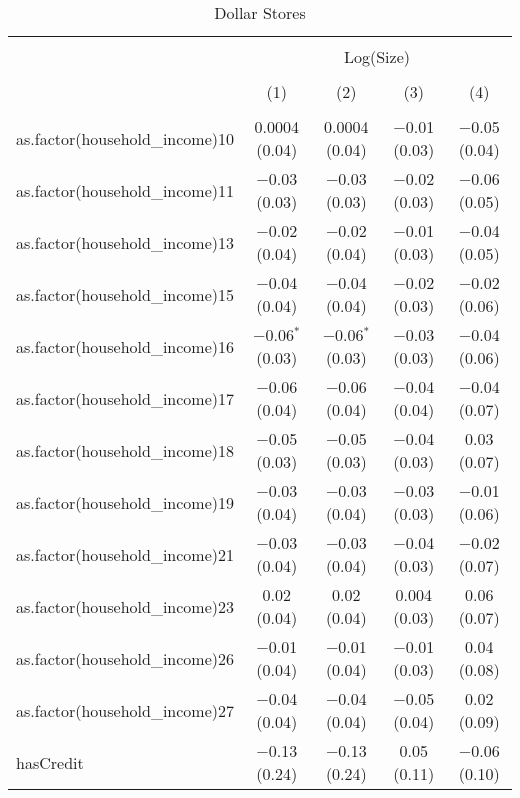 
\begin{table}[!htbp] \centering 
  \caption{Dollar Stores} 
  \label{tab:packageSizeDollarTamponLiqAppendix} 
\begin{tabular}{@{\extracolsep{5pt}}lcccc} 
\\[-1.8ex]\hline 
\hline \\[-1.8ex] 
 & \multicolumn{4}{c}{Log(Size)} \\ 
\\[-1.8ex] & (1) & (2) & (3) & (4)\\ 
\hline \\[-1.8ex] 
 as.factor(household\_income)10 & 0.0004 (0.04) & 0.0004 (0.04) & $-$0.01 (0.03) & $-$0.05 (0.04) \\ 
  as.factor(household\_income)11 & $-$0.03 (0.03) & $-$0.03 (0.03) & $-$0.02 (0.03) & $-$0.06 (0.05) \\ 
  as.factor(household\_income)13 & $-$0.02 (0.04) & $-$0.02 (0.04) & $-$0.01 (0.03) & $-$0.04 (0.05) \\ 
  as.factor(household\_income)15 & $-$0.04 (0.04) & $-$0.04 (0.04) & $-$0.02 (0.03) & $-$0.02 (0.06) \\ 
  as.factor(household\_income)16 & $-$0.06$^{*}$ (0.03) & $-$0.06$^{*}$ (0.03) & $-$0.03 (0.03) & $-$0.04 (0.06) \\ 
  as.factor(household\_income)17 & $-$0.06 (0.04) & $-$0.06 (0.04) & $-$0.04 (0.04) & $-$0.04 (0.07) \\ 
  as.factor(household\_income)18 & $-$0.05 (0.03) & $-$0.05 (0.03) & $-$0.04 (0.03) & 0.03 (0.07) \\ 
  as.factor(household\_income)19 & $-$0.03 (0.04) & $-$0.03 (0.04) & $-$0.03 (0.03) & $-$0.01 (0.06) \\ 
  as.factor(household\_income)21 & $-$0.03 (0.04) & $-$0.03 (0.04) & $-$0.04 (0.03) & $-$0.02 (0.07) \\ 
  as.factor(household\_income)23 & 0.02 (0.04) & 0.02 (0.04) & 0.004 (0.03) & 0.06 (0.07) \\ 
  as.factor(household\_income)26 & $-$0.01 (0.04) & $-$0.01 (0.04) & $-$0.01 (0.03) & 0.04 (0.08) \\ 
  as.factor(household\_income)27 & $-$0.04 (0.04) & $-$0.04 (0.04) & $-$0.05 (0.04) & 0.02 (0.09) \\ 
  hasCredit & $-$0.13 (0.24) & $-$0.13 (0.24) & 0.05 (0.11) & $-$0.06 (0.10) \\ 

\end{tabular}
\end{table}
